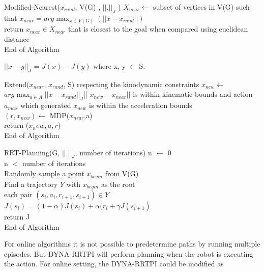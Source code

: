 \documentclass[MTech]{iitmdiss}
\begin{document}
\begin{algorithm}{Modified-Nearest($x_{rand}$, V(G) , $|| . ||_J$ )}{
\label{algo: Modified-Nearest}
}
 $X_{near} \leftarrow$ subset of vertices in V(G) such that  $x_{near} = \displaystyle arg\max_{x \in V(G)} (|| x - x_{rand}|| ) $\\
 return $x_{near} \in X_{near}$ that is closest to the goal when compared using euclidean distance\\
End of Algorithm
\end{algorithm}
$||x - y||_J$ = $J(x) - J(y)$ where x, y $\in$ S.
 
\begin{algorithm}{Extend($x_{near}$, $x_{rand}$, S)}{
\label{algo:Extend}
 respecting the kinodynamic constraints}
 $x_{new} \leftarrow$  $\displaystyle arg\max_{a \in A} ||x - x_{rand} ||_J $|| $x_{new} - x_{near} ||$ is within kinematic bounds and action $a_{max}$ which generated $x_{new}$ is within the acceleration bounds\\
 $(r,x_{new} ) \leftarrow$ MDP($x_{near}$,a)\\ 
 return ($x_new, a, r$)\\
End of Algorithm
\end{algorithm}


\begin{algorithm}{RRT-Planning(G, $|| . ||_J$, number of iterations)}{
\label{algo:Simulate RRT sampling trajectories from given rrt and update value function}
}
n $\leftarrow$ 0\\
\qwhile n $<$ number of iterations\\
Randomly sample a point $x_{begin}$ from V(G)\\
Find a trajectory $Y$ with $x_{begin}$ as the root\\
\qfor each pair $(s_i,a_i,r_{i+1}, s_{i+1}) \in Y$\\
$J(s_i) = (1 - \alpha) J(s_i) + \alpha(r_i + \gamma J(s_{i+1})$\qrof\qend\\
return J\\
End of Algorithm
\end{algorithm}


For online algorithms it is not possible to predetermine paths by running multiple episodes. But DYNA-RRTPI will perform planning when the robot is executing the action. For online setting, the DYNA-RRTPI could be modified as
\end{document}
